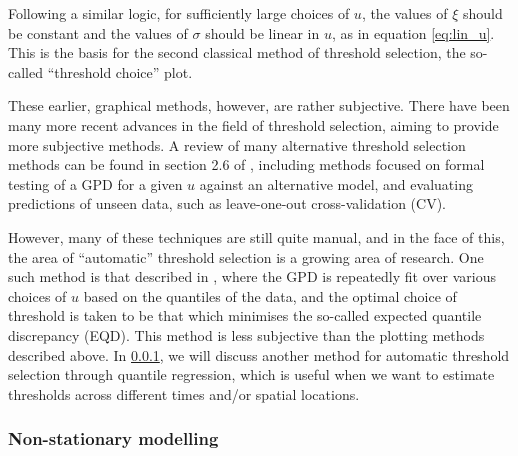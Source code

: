 \documentclass{article}
\numberwithin{equation}{section}
\begin{document}
Following a similar logic, for sufficiently large choices of $u$, the values of $\xi$ should be constant and the values of $\sigma$ should be linear in $u$, as in equation \ref{eq:lin_u}.
This is the basis for the second classical method of threshold selection, the so-called ``threshold choice'' plot.

These earlier, graphical methods, however, are rather subjective.
There have been many more recent advances in the field of threshold selection, aiming to provide more subjective methods. 
A review of many alternative threshold selection methods can be found in section 2.6 of \citet{Belzile2022}, including methods focused on formal testing of a GPD for a given $u$ against an alternative model, and evaluating predictions of unseen data, such as leave-one-out cross-validation (CV). 

However, many of these techniques are still quite manual, and in the face of this, the area of ``automatic'' threshold selection is a growing area of research. 
One such method is that described in \citet{Murphy2024}, where the GPD is repeatedly fit over various choices of $u$ based on the quantiles of the data, and the optimal choice of threshold is taken to be that which minimises the so-called expected quantile discrepancy (EQD).
This method is less subjective than the plotting methods described above.
In \ref{subsubsec:non_stationary}, we will discuss another method for automatic threshold selection through quantile regression, which is useful when we want to estimate thresholds across different times and/or spatial locations.

\subsubsection{Non-stationary modelling} \label{subsubsec:non_stationary}
\end{document}

